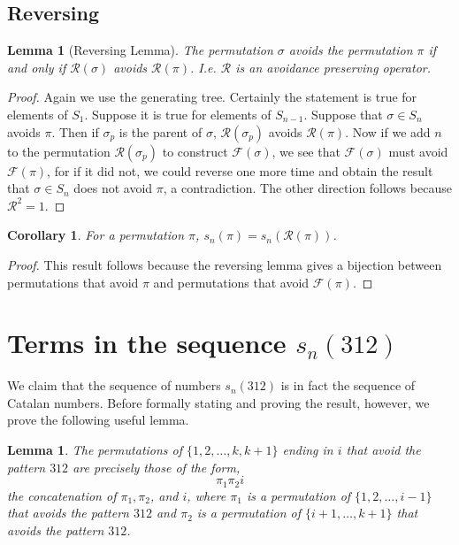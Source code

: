 \documentclass[11pt,letterpaper,twoside,english]{article}
\theoremstyle{theorem}
\newtheorem{corollary}[theorem]{Corollary}
\newtheorem{lemma}[theorem]{Lemma}
\theoremstyle{remark}
\begin{document}
\subsection{Reversing}

\begin{lemma}[Reversing Lemma]
The permutation $\sigma$ avoids the permutation $\pi$ if and only if $\mathcal{R}(\sigma)$ avoids $\mathcal{R}(\pi)$. I.e. $\mathcal{R}$ is an avoidance preserving operator. 
\end{lemma}
\begin{proof}
Again we use the generating tree. Certainly the statement is true for elements of $S_1$. Suppose it is true for elements of $S_{n-1}$. Suppose that $\sigma\in S_n$ avoids $\pi$. Then if $\sigma_p$ is the parent of $\sigma$, $\mathcal{R}(\sigma_p)$ avoids $\mathcal{R}(\pi)$. Now if we add $n$ to the permutation $\mathcal{R}(\sigma_p)$ to construct $\mathcal{F}(\sigma)$, we see that $\mathcal{F}(\sigma)$ must avoid $\mathcal{F}(\pi)$, for if it did not, we could reverse one more time and obtain the result that $\sigma\in S_n$ does not avoid $\pi$, a contradiction. The other direction follows because $\mathcal{R}^2=1$. 
\end{proof}

\begin{corollary} 
For a permutation $\pi$, $s_n(\pi)=s_n(\mathcal{R}(\pi))$. 
\end{corollary}
\begin{proof}
This result follows because the reversing lemma gives a bijection between permutations that avoid $\pi$ and permutations that avoid $\mathcal{F}(\pi)$. 
\end{proof}
\section{Terms in the sequence $s_n(312)$}
\label{312}

We claim that the sequence of numbers $s_n(312)$ is in fact the sequence of Catalan numbers. Before formally stating and proving the result, however, we prove the following useful lemma.
\begin{lemma}
\label{lemma1}
The permutations of $\{1,2,\dots,k,k+1\}$ ending in $i$ that avoid the pattern $312$ are precisely those of the form,
$$\pi_1 \pi_2 i$$
the concatenation of $\pi_1, \pi_2$, and $i$, where $\pi_1$ is a permutation of $\{1,2,\ldots,i-1\}$ that avoids the pattern $312$ and $\pi_2$ is a permutation of $\{i+1,\ldots,k+1\}$ that avoids the pattern $312$.
\end{lemma}
\end{document}
